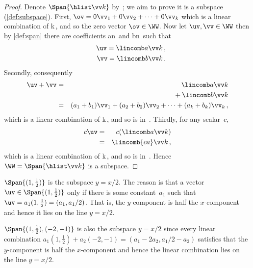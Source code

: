 \begin{proof}
Denote \(\Span\{\hlist\vv k\}\) by~\WW; we aim to prove it is a subspace (\autoref{def:subspace}).
First, \(\ov=0\vv_1+0\vv_2+\cdots+0\vv_k\) which is a linear combination of \hlist\vv k\,, and so the zero vector \(\ov\in\WW\).
Now let \(\uv,\vv\in\WW\) then by \autoref{def:span} there are coefficients \hlist an\ and \hlist bn\ such that
\begin{eqnarray*}
&&\uv=\lincomb a\vv k\,,
\\&&\vv=\lincomb b\vv k\,.
\end{eqnarray*}
Secondly, consequently
\begin{eqnarray*}
\uv+\vv&=&
\lincomb a\vv k
\\&&{}+\lincomb b\vv k
\\&=&(a_1+b_1)\vv_1+(a_2+b_2)\vv_2+\cdots+(a_k+b_k)\vv_k\,,
\end{eqnarray*}
which is a linear combination of \hlist\vv k\,, and so is in~\WW.
Thirdly, for any scalar~\(c\),
\begin{eqnarray*}
c\uv&=&c(\lincomb a\vv k)
\\&=&\lincomb {ca}\vv k\,,
\end{eqnarray*}
which is a linear combination of \hlist\vv k\,, and so is in~\WW.
Hence \(\WW=\Span\{\hlist\vv k\}\) is a subspace.
\end{proof}


\begin{example} \label{eg:1x2subs}
\(\Span\{(1,\frac12)\}\) is the subspace \(y=x/2\).
The reason is that a vector \(\uv\in\Span\{(1,\frac12)\}\) only if there is some constant~\(a_1\) such that \(\uv=a_1(1,\frac12)=(a_1,a_1/2)\).
That is, the \(y\)-component is half the \(x\)-component and hence it lies on the line \(y=x/2\).

\(\Span\{(1,\frac12),(-2,-1)\}\) is also the subspace \(y=x/2\) since every linear combination \(a_1(1,\frac12)+a_2(-2,-1)=(a_1-2a_2,a_1/2-a_2)\) satisfies that the \(y\)-component is half the \(x\)-component and hence the linear combination lies on the line \(y=x/2\).
\end{example}


